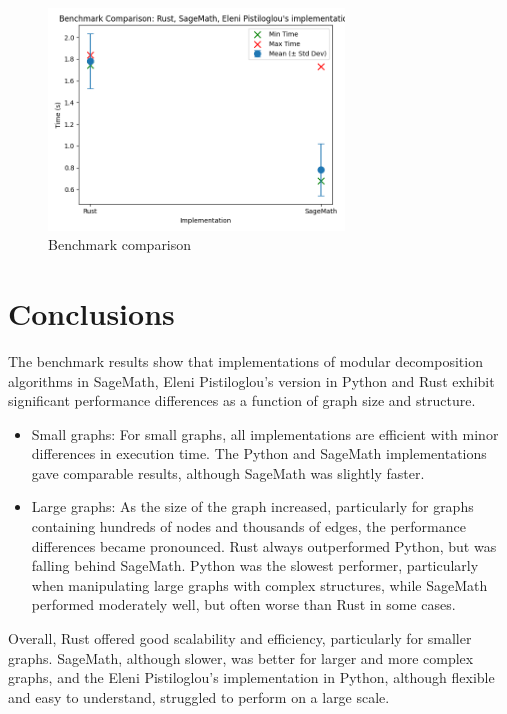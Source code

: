 \begin{figure}[!h]
    \centering
    \includegraphics[width=0.70\textwidth]{images/benchmark/graph_1000_100206/benchmark_comparison_graph_1000_100206}
    \caption{Benchmark comparison}
    \label{fig:benchmark-comparison-graph-1000-100206}
\end{figure}


\newpage

\section{Conclusions}\label{sec:conclusions}

The benchmark results show that implementations of modular decomposition algorithms in SageMath, Eleni Pistiloglou's version in Python and Rust exhibit significant performance differences as a function of graph size and structure.

\begin{itemize}
    \item Small graphs: For small graphs, all implementations are efficient with minor differences in execution time.
    The Python and SageMath implementations gave comparable results, although SageMath was slightly faster.
    \item Large graphs: As the size of the graph increased, particularly for graphs containing hundreds of nodes and thousands of edges, the performance differences became pronounced.
    Rust always outperformed Python, but was falling behind SageMath.
    Python was the slowest performer, particularly when manipulating large graphs with complex structures, while SageMath performed moderately well, but often worse than Rust in some cases.
\end{itemize}

Overall, Rust offered good scalability and efficiency, particularly for smaller graphs.
SageMath, although slower, was better for larger and more complex graphs, and the Eleni Pistiloglou's implementation in Python, although flexible and easy to understand, struggled to perform on a large scale.

